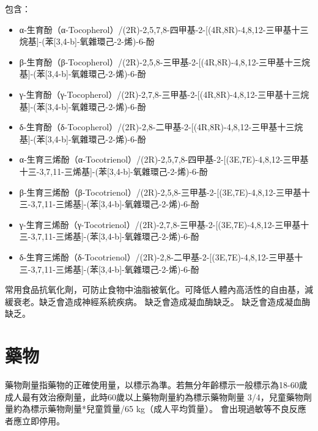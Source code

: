 \documentclass[a4paper,12pt]{report}
\begin{document}
\begin{itemize}
\begin{itemize}
包含：
\begin{itemize}
\item α-生育酚（α-Tocopherol）/(2R)-2,5,7,8-四甲基-2-[(4R,8R)-4,8,12-三甲基十三烷基]-(苯[3,4-b]-氧雜環己-2-烯)-6-酚
\item β-生育酚（β-Tocopherol）/(2R)-2,5,8-三甲基-2-[(4R,8R)-4,8,12-三甲基十三烷基]-(苯[3,4-b]-氧雜環己-2-烯)-6-酚
\item γ-生育酚（γ-Tocopherol）/(2R)-2,7,8-三甲基-2-[(4R,8R)-4,8,12-三甲基十三烷基]-(苯[3,4-b]-氧雜環己-2-烯)-6-酚
\item δ-生育酚（δ-Tocopherol）/(2R)-2,8-二甲基-2-[(4R,8R)-4,8,12-三甲基十三烷基]-(苯[3,4-b]-氧雜環己-2-烯)-6-酚
\item α-生育三烯酚（α-Tocotrienol）/(2R)-2,5,7,8-四甲基-2-[(3E,7E)-4,8,12-三甲基十三-3,7,11-三烯基]-(苯[3,4-b]-氧雜環己-2-烯)-6-酚
\item β-生育三烯酚（β-Tocotrienol）/(2R)-2,5,8-三甲基-2-[(3E,7E)-4,8,12-三甲基十三-3,7,11-三烯基]-(苯[3,4-b]-氧雜環己-2-烯)-6-酚
\item γ-生育三烯酚（γ-Tocotrienol）/(2R)-2,7,8-三甲基-2-[(3E,7E)-4,8,12-三甲基十三-3,7,11-三烯基]-(苯[3,4-b]-氧雜環己-2-烯)-6-酚
\item δ-生育三烯酚（δ-Tocotrienol）/(2R)-2,8-二甲基-2-[(3E,7E)-4,8,12-三甲基十三-3,7,11-三烯基]-(苯[3,4-b]-氧雜環己-2-烯)-6-酚
\end{itemize}

常用食品抗氧化劑，可防止食物中油脂被氧化。可降低人體內高活性的自由基，減緩衰老。缺乏會造成神經系統疾病。
缺乏會造成凝血酶缺乏。
缺乏會造成凝血酶缺乏。


\section{藥物}
藥物劑量指藥物的正確使用量，以標示為準。若無分年齡標示一般標示為18-60歲成人最有效治療劑量，此時60歲以上藥物劑量約為標示藥物劑量 3/4，兒童藥物劑量約為標示藥物劑量*兒童質量/65 kg（成人平均質量）。
會出現過敏等不良反應者應立即停用。


\end{itemize}
\end{itemize}
\end{document}
